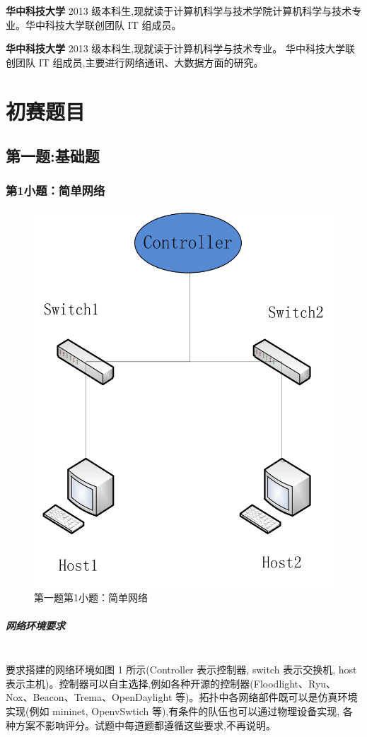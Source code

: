 \documentclass[format=draft,language=chinese,category=SDN]{hustreport}
\newcommand{\myparagraph}[1]{\paragraph{#1}\mbox{}\\}
\begin{document}
\textbf{华中科技大学} 2013 级本科生,现就读于计算机科学与技术学院计算机科学与技术专业。华中科技大学联创团队 IT 组成员。


\textbf{华中科技大学} 2013 级本科生,现就读于计算机科学与技术专业。
华中科技大学联创团队 IT 组成员,主要进行网络通讯、大数据方面的研究。

\chapter{初赛题目}\label{chapter:Questions}


\section{第一题:基础题}\label{sec:Q1}
\subsection{第1小题：简单网络}\label{sec:Q1_1}

\begin{figure}[!h] \centering
\includegraphics[width=.618\textwidth]{fig/1_1-0.png}
\caption{第一题第1小题：简单网络}\label{fig:Q1_1-0}
\end{figure}

\myparagraph{网络环境要求}

要求搭建的网络环境如图 1 所示(Controller 表示控制器, switch 表示交换机, host表示主机)。控制器可以自主选择,例如各种开源的控制器(Floodlight、Ryu、
Nox、Beacon、Trema、OpenDaylight 等)。拓扑中各网络部件既可以是仿真环境实现(例如 mininet, OpenvSwtich 等),有条件的队伍也可以通过物理设备实现,
各种方案不影响评分。试题中每道题都遵循这些要求,不再说明。
\end{document}
